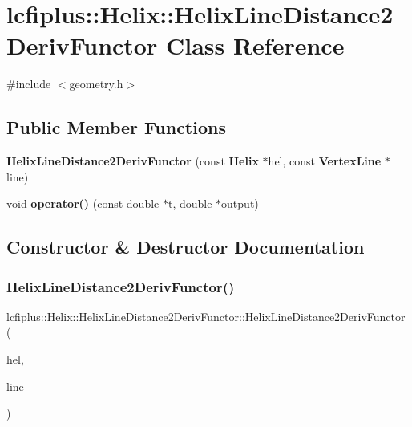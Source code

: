 \section{lcfiplus\+:\+:Helix\+:\+:Helix\+Line\+Distance2\+Deriv\+Functor Class Reference}
\label{classlcfiplus_1_1Helix_1_1HelixLineDistance2DerivFunctor}


{\ttfamily \#include $<$geometry.\+h$>$}

\subsection*{Public Member Functions}
\begin{DoxyCompactItemize}
\item 
\textbf{ Helix\+Line\+Distance2\+Deriv\+Functor} (const \textbf{ Helix} $\ast$hel, const \textbf{ Vertex\+Line} $\ast$line)
\item 
void \textbf{ operator()} (const double $\ast$t, double $\ast$output)
\end{DoxyCompactItemize}


\subsection{Constructor \& Destructor Documentation}
\mbox{\label{classlcfiplus_1_1Helix_1_1HelixLineDistance2DerivFunctor_a8d422f707666246bbdc04adf6f56fb1d}} 
\subsubsection{Helix\+Line\+Distance2\+Deriv\+Functor()}
{\footnotesize\ttfamily lcfiplus\+::\+Helix\+::\+Helix\+Line\+Distance2\+Deriv\+Functor\+::\+Helix\+Line\+Distance2\+Deriv\+Functor (\begin{DoxyParamCaption}\item[{const \textbf{ Helix} $\ast$}]{hel,  }\item[{const \textbf{ Vertex\+Line} $\ast$}]{line }\end{DoxyParamCaption})\hspace{0.3cm}{\ttfamily [inline]}}



